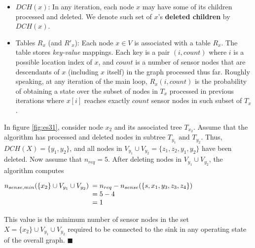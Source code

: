 \begin{itemize}[noitemsep]
\item	$DCH(x)$:	In any iteration, each node $x$ may have some of its children
	processed and deleted.
	We denote such set of $x$'s \textbf{deleted children} by $DCH(x)$.

\item	Tables $R_x$ (and $R'_x$):
	Each node $x \in V$ is associated with a table $R_x$.
	The table stores {\em key-value} mappings.
	Each key is a pair $(i,count)$ where $i$ is a possible location
	index of $x$, and $count$ is a number of sensor nodes that are
	descendants of $x$ (including $x$ itself) in the graph processed
	thus far.
	Roughly speaking, at any iteration of the main loop,
	$R_x(i,count)$ is the probability of obtaining a state over
	the subset of nodes in $T_x$ processed in previous iterations
	where $x[i]$ reaches exactly $count$ sensor nodes in such subset of
	$T_x$. 

\end{itemize}
\begin{example}
\normalfont
In figure \ref{fig:es31}, consider node $x_2$ and its associated tree $T_{x_2}$. Assume that the algorithm has processed and deleted nodes in subtree $T_{y_1} \mbox{ and } T_{y_2}$. Thus, $DCH(X)=\{y_1,y_2\}$, and all nodes in $V_{y_1}\cup V_{y_2}=\{z_1,z_2,y_1,y_2\}$ have been deleted. Now assume that $n_{req}=5$. After deleting nodes in  $V_{y_1}\cup V_{y_2}$, the algorithm computes\\
\centerline{
$n_{sense,min}(\{x_2\}\cup V_{y_1}\cup V_{y_2}) \begin{array}[t]{l}
=n_{req}-n_{sense}(\{s,x_1,y_3,z_3,z_4\})\\
=5-4\\
=1
\end{array}
$
}
This value is the minimum number of sensor nodes in the set $X=\{x_2\}\cup V_{y_1}\cup V_{y_2}$ required to be connected to the sink in any operating state of the overall graph. $\blacksquare$
\end{example}
